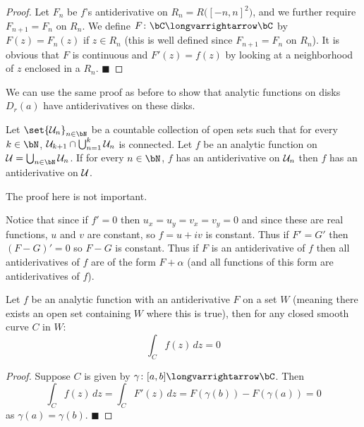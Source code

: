 \documentclass[10pt]{article}
\def\mU{{\cal U}}
\let\longto=\longvarrightarrow
\def\qed{\hskip1cm\hbox{}\hfill$\blacksquare$}
\begin{document}
\begin{proof}

    Let $F_n$ be $f$'s antiderivative on $R_n=R\bigl([-n,n]^2\bigr)$, and we further require $F_{n+1}=F_n$ on $R_n$.
    We define $F\colon\bC\longto\bC$ by $F(z)=F_n(z)$ if $z\in R_n$ (this is well defined since $F_{n+1}=F_n$ on $R_n$).
    It is obvious that $F$ is continuous and $F'(z)=f(z)$ by looking at a neighborhood of $z$ enclosed in a $R_n$.
    \qed

\end{proof}

We can use the same proof as before to show that analytic functions on disks $D_r(a)$ have antiderivatives on these disks.

\begin{prop*}

    Let $\set{\mU_n}_{n\in\bN}$ be a countable collection of open sets such that for every $k\in\bN$, $\mU_{k+1}\cap\bigcup_{n=1}^k\mU_n$ is connected.
    Let $f$ be an analytic function on $\mU=\bigcup_{n\in\bN}\mU_n$.
    If for every $n\in\bN$, $f$ has an antiderivative on $\mU_n$ then $f$ has an antiderivative on $\mU$.

\end{prop*}

The proof here is not important.

Notice that since if $f'=0$ then $u_x=u_y=v_x=v_y=0$ and since these are real functions, $u$ and $v$ are constant, so $f=u+iv$ is constant.
Thus if $F'=G'$ then $(F-G)'=0$ so $F-G$ is constant.
Thus if $F$ is an antiderivative of $f$ then all antiderivatives of $f$ are of the form $F+\alpha$ (and all functions of this form are antiderivatives of $f$).

\begin{lemm*}

    Let $f$ be an analytic function with an antiderivative $F$ on a set $W$ (meaning there exists an open set containing $W$ where this is true), then for any closed smooth curve $C$ in $W$:
    \[ \int_C f(z)\,dz = 0 \]

\end{lemm*}

\begin{proof}

    Suppose $C$ is given by $\gamma\colon[a,b]\longto\bC$.
    Then
    \[ \int_C f(z)\,dz = \int_C F'(z)\,dz = F(\gamma(b)) - F(\gamma(a)) = 0 \]
    as $\gamma(a)=\gamma(b)$.
    \qed

\end{proof}
\end{document}

